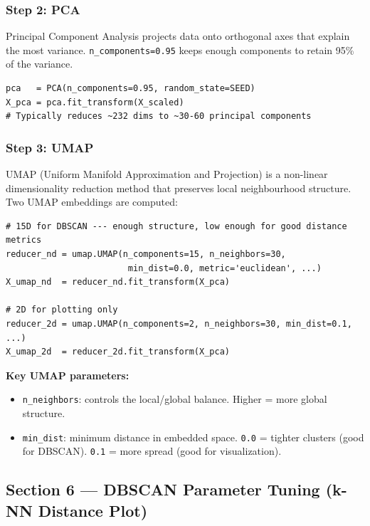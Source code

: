 \documentclass[12pt,a4paper]{article}
\begin{document}
\subsubsection{Step 2: PCA}
Principal Component Analysis projects data onto orthogonal axes that explain the most variance. \texttt{n\_components=0.95} keeps enough components to retain 95\% of the variance.

\begin{lstlisting}
pca   = PCA(n_components=0.95, random_state=SEED)
X_pca = pca.fit_transform(X_scaled)
# Typically reduces ~232 dims to ~30-60 principal components
\end{lstlisting}

\subsubsection{Step 3: UMAP}
UMAP (Uniform Manifold Approximation and Projection) is a non-linear dimensionality reduction method that preserves local neighbourhood structure. Two UMAP embeddings are computed:

\begin{lstlisting}
# 15D for DBSCAN --- enough structure, low enough for good distance metrics
reducer_nd = umap.UMAP(n_components=15, n_neighbors=30,
                        min_dist=0.0, metric='euclidean', ...)
X_umap_nd  = reducer_nd.fit_transform(X_pca)

# 2D for plotting only
reducer_2d = umap.UMAP(n_components=2, n_neighbors=30, min_dist=0.1, ...)
X_umap_2d  = reducer_2d.fit_transform(X_pca)
\end{lstlisting}

\begin{infobox}
\textbf{Key UMAP parameters:}
\begin{itemize}[nosep]
  \item \texttt{n\_neighbors}: controls the local/global balance. Higher = more global structure.
  \item \texttt{min\_dist}: minimum distance in embedded space. \texttt{0.0} = tighter clusters (good for DBSCAN). \texttt{0.1} = more spread (good for visualization).
\end{itemize}
\end{infobox}

\subsection{Section 6 --- DBSCAN Parameter Tuning (k-NN Distance Plot)}
\end{document}
